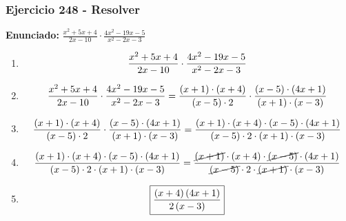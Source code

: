 \documentclass[11pt,a4paper]{article}
\newcommand{\fitmath}[1]{%
\[
\setbox0=\hbox{$\displaystyle #1$}%
\ifdim\wd0>\linewidth
\resizebox{\linewidth}{!}{$\displaystyle #1$}%
\else
#1%
\fi
\]
}
\begin{document}
\subsubsection*{Ejercicio 248 - Resolver}
\textbf{Enunciado:} $ \frac{x^{2} + 5 x + 4}{2 x - 10} \cdot \frac{4 x^{2} - 19 x - 5}{x^{2} - 2 x - 3} $\par
\begin{enumerate}[leftmargin=2em]
\item \fitmath{\frac{x^{2} + 5 x + 4}{2 x - 10} \cdot \frac{4 x^{2} - 19 x - 5}{x^{2} - 2 x - 3}}
\item \fitmath{\frac{x^{2} + 5 x + 4}{2 x - 10} \cdot \frac{4 x^{2} - 19 x - 5}{x^{2} - 2 x - 3}= \frac{\left(x + 1\right)\cdot \left(x + 4\right)}{\left(x - 5\right)\cdot 2} \cdot \frac{\left(x - 5\right)\cdot \left(4 x + 1\right)}{\left(x + 1\right)\cdot \left(x - 3\right)}}
\item \fitmath{\frac{\left(x + 1\right)\cdot \left(x + 4\right)}{\left(x - 5\right)\cdot 2}\cdot \frac{\left(x - 5\right)\cdot \left(4 x + 1\right)}{\left(x + 1\right)\cdot \left(x - 3\right)}= \frac{\left(x + 1\right)\cdot \left(x + 4\right)\cdot \left(x - 5\right)\cdot \left(4 x + 1\right)}{\left(x - 5\right)\cdot 2\cdot \left(x + 1\right)\cdot \left(x - 3\right)}}
\item \fitmath{\frac{\left(x + 1\right)\cdot \left(x + 4\right)\cdot \left(x - 5\right)\cdot \left(4 x + 1\right)}{\left(x - 5\right)\cdot 2\cdot \left(x + 1\right)\cdot \left(x - 3\right)}= \frac{\cancel{\left(x + 1\right)}\cdot \left(x + 4\right)\cdot \cancel{\left(x - 5\right)}\cdot \left(4 x + 1\right)}{\cancel{\left(x - 5\right)}\cdot 2\cdot \cancel{\left(x + 1\right)}\cdot \left(x - 3\right)}}
\item \fitmath{\boxed{\frac{\left(x + 4\right) \left(4 x + 1\right)}{2 \left(x - 3\right)}}}
\end{enumerate}

\vspace{0.12cm}
\end{document}
